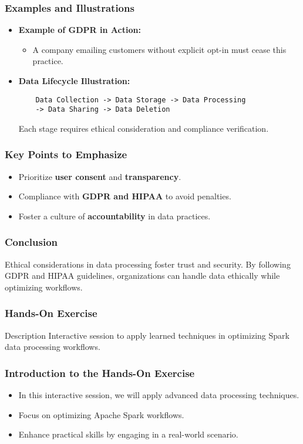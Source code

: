 \documentclass[aspectratio=169]{beamer}
\begin{document}
\begin{frame}[fragile]
    \frametitle{Examples and Illustrations}
    \begin{itemize}
        \item \textbf{Example of GDPR in Action:}
            \begin{itemize}
                \item A company emailing customers without explicit opt-in must cease this practice.
            \end{itemize}
        \item \textbf{Data Lifecycle Illustration:}
            \begin{lstlisting}
    Data Collection -> Data Storage -> Data Processing 
    -> Data Sharing -> Data Deletion
            \end{lstlisting}
            Each stage requires ethical consideration and compliance verification.
    \end{itemize}
\end{frame}

\begin{frame}[fragile]
    \frametitle{Key Points to Emphasize}
    \begin{itemize}
        \item Prioritize \textbf{user consent} and \textbf{transparency}.
        \item Compliance with \textbf{GDPR and HIPAA} to avoid penalties.
        \item Foster a culture of \textbf{accountability} in data practices.
    \end{itemize}
\end{frame}

\begin{frame}[fragile]
    \frametitle{Conclusion}
    Ethical considerations in data processing foster trust and security. 
    By following GDPR and HIPAA guidelines, organizations can handle data ethically while optimizing workflows.
\end{frame}

\begin{frame}[fragile]
    \frametitle{Hands-On Exercise}
    \begin{block}{Description}
        Interactive session to apply learned techniques in optimizing Spark data processing workflows.
    \end{block}
\end{frame}

\begin{frame}[fragile]
    \frametitle{Introduction to the Hands-On Exercise}
    \begin{itemize}
        \item In this interactive session, we will apply advanced data processing techniques.
        \item Focus on optimizing Apache Spark workflows.
        \item Enhance practical skills by engaging in a real-world scenario.
    \end{itemize}
\end{frame}
\end{document}
